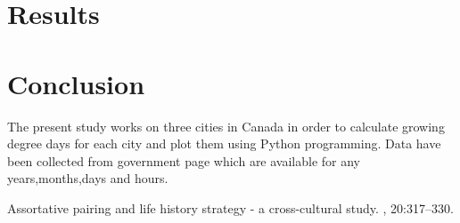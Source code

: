 \documentclass[DIV=calc, paper=a4, fontsize=11pt, twocolumn]{scrartcl}
\begin{document}
\section{Results}




\section{Conclusion}
The present study works on three cities in Canada in order to calculate growing degree days for each city and plot them using Python programming. Data have been collected from government page which are available for any years,months,days and hours.





\begin{thebibliography}{99} %




\newblock Assortative pairing and life history strategy - a cross-cultural
  study.
, 20:317--330.
 
\end{thebibliography}

\end{document}
